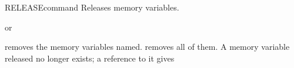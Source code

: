 \begin{XbaseEntry}{RELEASE}{command}
Releases memory variables.
\Syntax
{}
\par or\par
{}
\Usage
{} removes the memory variables named.   removes all
of them.  A memory variable released no longer exists; a reference to it
gives 
\Examples
{}
\end{XbaseEntry}

